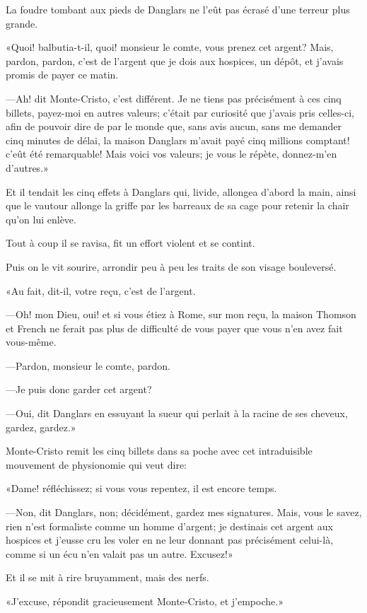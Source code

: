 La foudre tombant aux pieds de Danglars ne l'eût pas écrasé d'une terreur plus grande. 

«Quoi! balbutia-t-il, quoi! monsieur le comte, vous prenez cet argent? Mais, pardon, pardon, c'est de l'argent que je dois aux hospices, un dépôt, et j'avais promis de payer ce matin. 

—Ah! dit Monte-Cristo, c'est différent. Je ne tiens pas précisément à ces cinq billets, payez-moi en autres valeurs; c'était par curiosité que j'avais pris celles-ci, afin de pouvoir dire de par le monde que, sans avis aucun, sans me demander cinq minutes de délai, la maison Danglars m'avait payé cinq millions comptant! c'eût été remarquable! Mais voici vos valeurs; je vous le répète, donnez-m'en d'autres.» 

Et il tendait les cinq effets à Danglars qui, livide, allongea d'abord la main, ainsi que le vautour allonge la griffe par les barreaux de sa cage pour retenir la chair qu'on lui enlève. 

Tout à coup il se ravisa, fit un effort violent et se contint. 

Puis on le vit sourire, arrondir peu à peu les traits de son visage bouleversé. 

«Au fait, dit-il, votre reçu, c'est de l'argent. 

—Oh! mon Dieu, oui! et si vous étiez à Rome, sur mon reçu, la maison Thomson et French ne ferait pas plus de difficulté de vous payer que vous n'en avez fait vous-même. 

—Pardon, monsieur le comte, pardon. 

—Je puis donc garder cet argent? 

—Oui, dit Danglars en essuyant la sueur qui perlait à la racine de ses cheveux, gardez, gardez.» 

Monte-Cristo remit les cinq billets dans sa poche avec cet intraduisible mouvement de physionomie qui veut dire: 

«Dame! réfléchissez; si vous vous repentez, il est encore temps. 

—Non, dit Danglars, non; décidément, gardez mes signatures. Mais, vous le savez, rien n'est formaliste comme un homme d'argent; je destinais cet argent aux hospices et j'eusse cru les voler en ne leur donnant pas précisément celui-là, comme si un écu n'en valait pas un autre. Excusez!» 

Et il se mit à rire bruyamment, mais des nerfs. 

«J'excuse, répondit gracieusement Monte-Cristo, et j'empoche.» 

